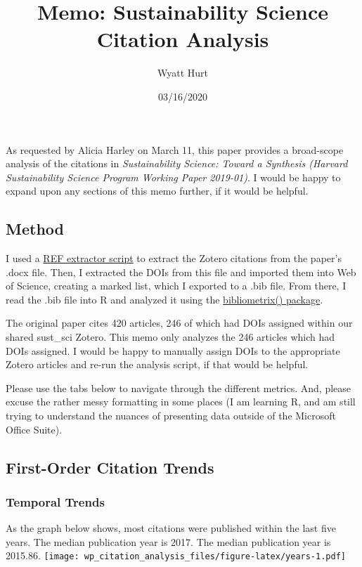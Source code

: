 \documentclass[]{article}
\title{Memo: Sustainability Science Citation Analysis}
\author{Wyatt Hurt}
\date{03/16/2020}
\begin{document}
\maketitle

As requested by Alicia Harley on March 11, this paper provides a
broad-scope analysis of the citations in \emph{Sustainability Science:
Toward a Synthesis (Harvard Sustainability Science Program Working Paper
2019-01)}. I would be happy to expand upon any sections of this memo
further, if it would be helpful.

\hypertarget{method}{%
\subsection{Method}\label{method}}

I used a \href{https://rintze.zelle.me/ref-extractor/}{REF extractor
script} to extract the Zotero citations from the paper's .docx file.
Then, I extracted the DOIs from this file and imported them into Web of
Science, creating a marked list, which I exported to a .bib file. From
there, I read the .bib file into R and analyzed it using the
\href{https://www.bibliometrix.org/}{bibliometrix() package}.

The original paper cites 420 articles, 246 of which had DOIs assigned
within our shared sust\_sci Zotero. This memo only analyzes the 246
articles which had DOIs assigned. I would be happy to manually assign
DOIs to the appropriate Zotero articles and re-run the analysis script,
if that would be helpful.

Please use the tabs below to navigate through the different metrics.
And, please excuse the rather messy formatting in some places (I am
learning R, and am still trying to understand the nuances of presenting
data outside of the Microsoft Office Suite).

\hypertarget{first-order-citation-trends}{%
\subsection{First-Order Citation
Trends}\label{first-order-citation-trends}}

\hypertarget{temporal-trends}{%
\subsubsection{Temporal Trends}\label{temporal-trends}}

As the graph below shows, most citations were published within the last
five years. The median publication year is 2017. The median publication
year is 2015.86.
\texttt{[image: wp\_citation\_analysis\_files/figure-latex/years-1.pdf]}
\end{document}
